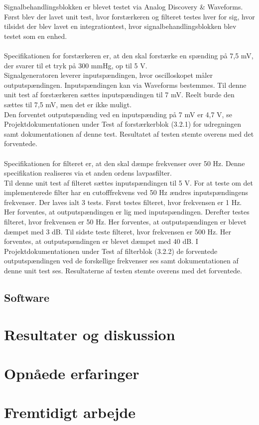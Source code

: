 Signalbehandlingsblokken er blevet testet via Analog Discovery \& Waveforms. Først blev der lavet unit test, hvor forstærkeren og filteret testes hver for sig, hvor tilsidst der blev lavet en integrationtest, hvor signalbehandlingsblokken blev testet som en enhed. 
\\\\
Specifikationen for forstærkeren er, at den skal forstærke en spænding på 7,5 mV, der svarer til et tryk på 300 mmHg, op til 5 V. \\
Signalgeneratoren leverer inputspændingen, hvor oscilloskopet måler outputspændingen. Inputspændingen kan via Waveforms bestemmes. Til denne unit test af forstærkeren sættes inputspændingen til 7 mV. Reelt burde den sættes til 7,5 mV, men det er ikke muligt. \\
Den forventet outputspænding ved en inputspænding på 7 mV er 4,7 V, se Projektdokumentationen under Test af forstærkerblok (3.2.1) for udregningen samt dokumentationen af denne test.
Resultatet af testen stemte overens med det forventede. 
\\\\
Specifikationen for filteret er, at den skal dæmpe frekvenser over 50 Hz. Denne specifikation realiseres via et anden ordens lavpasfilter. \\
Til denne unit test af filteret sættes inputspændingen til 5 V. For at teste om det implementerede filter har en cutofffrekvens ved 50 Hz ændres inputspændingens frekvenser. Der laves ialt 3 tests. Først testes filteret, hvor frekvensen er 1 Hz. Her forventes, at outputspændingen er lig med inputspændingen. Derefter testes filteret, hvor frekvensen er 50 Hz. Her forventes, at outputspændingen er blevet dæmpet med 3 dB. Til sidste teste filteret, hvor frekvensen er 500 Hz. Her forventes, at outputspændingen er blevet dæmpet med 40 dB. I Projektdokumentationen under Test af filterblok (3.2.2) de forventede outputspændingen ved de forskellige frekvenser ses samt dokumentationen af denne unit test ses. 
Resultaterne af testen stemte overens med det forventede.  

    
 
 


 

\subsection{Software}

\section{Resultater og diskussion}

\section{Opnåede erfaringer}

\section{Fremtidigt arbejde}



